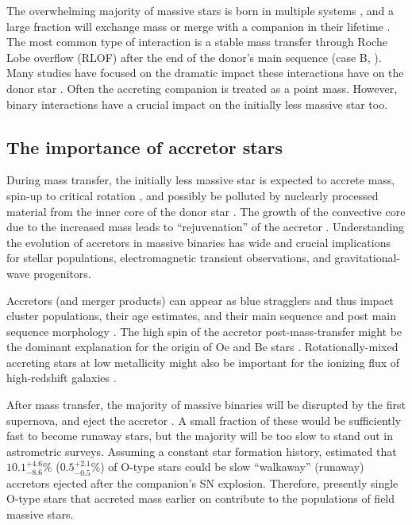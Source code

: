 \documentclass[twocolumn,twocolappendix,trackchanges]{aastex63}
\newcommand{\todo}[1]{{\large $\blacksquare$~\textbf{\color{red}[#1]}}~$\blacksquare$}
\begin{document}
The overwhelming majority of massive stars is born in multiple systems
\citep[e.g.,][]{mason:09, almeida:17, moe:17}, and a large fraction will
exchange mass or merge with a companion in their lifetime
\citep[e.g.,][]{sana:12}. The most common type of interaction is a
stable mass transfer through Roche Lobe overflow (RLOF) after the end of the donor's main sequence (case
B, \citealt{kippenhahn:67}).  Many
studies %
have focused on the dramatic impact these interactions have on the
donor star \citep[e.g.,][]{morton:60, yoon:17, gotberg:17, gotberg:18, laplace:20,
  laplace:21, blagorodnova:21}. Often the accreting companion is treated as a point mass.
However, binary interactions have a crucial impact on the initially
less massive star too.

\subsection{The importance of accretor stars}

During mass transfer, the initially less massive star is expected to
accrete mass, spin-up to critical rotation \citep[e.g.,][]{packet:81},
and possibly be polluted by nuclearly processed material from the
inner core of the donor star \citep[e.g.,][]{blaauw:93}. The growth of
the convective core due to the increased mass leads to
``rejuvenation'' of the accretor \citep[e.g.,][]{neo:77,
  schneider:16}. Understanding the evolution of accretors in massive
binaries has wide and crucial implications for stellar populations,
electromagnetic transient observations, and gravitational-wave
progenitors.

Accretors
(and merger products) can appear as blue stragglers
\citep[e.g.,][]{chen:09, chen:10, rain:21} and thus impact cluster
populations, their age estimates, and their main sequence
\citep[e.g.,][]{pols_marinus:94, wang:20} and post main sequence morphology
\citep[e.g.,][]{wei:21}. The high spin of the
accretor post-mass-transfer might be the dominant explanation for the origin of
Oe and Be stars \citep[i.e., stars showing emission lines, e.g.,][]{pols:91, bodensteiner:20,
  vinciguerra:20, dorigo-jones:20, wang:21_sdOBe}. Rotationally-mixed accreting
stars at low metallicity might also be important for the ionizing flux of high-redshift
galaxies \citep[e.g.,][]{eldridge:12}.

After mass transfer, the majority of massive binaries will be
disrupted by the first supernova, and eject the accretor \citep[``binary SN
scenario'', ][]{blaauw:61, dedonder:97, eldridge:11, boubert:18,
  renzo:19walk, evans:20}.  A small fraction of these would be
sufficiently fast to become runaway stars, but the majority will be
too slow to stand out in astrometric surveys. Assuming a constant star
formation history, \cite{renzo:19walk} estimated that
$10.1^{+4.6}_{-8.6}\%$ ($0.5^{+2.1}_{-0.5}\%$) of O-type stars could
be slow ``walkaway'' (runaway) accretors ejected after the companion's
SN explosion.  Therefore, presently single O-type stars that accreted
mass earlier on contribute to the populations of field massive stars.
\end{document}

